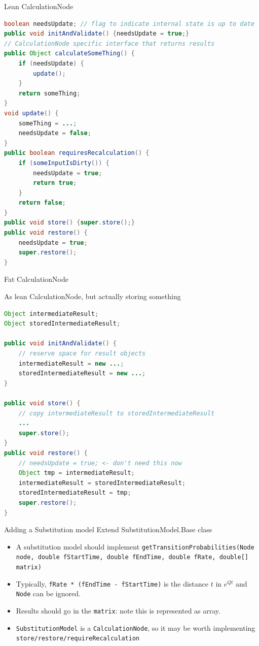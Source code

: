 \documentclass{beamer}
\theoremstyle{definition}
\begin{document}
\begin{frame}[containsverbatim]{Lean CalculationNode}


\begin{lstlisting}[language=java]
boolean needsUpdate; // flag to indicate internal state is up to date
public void initAndValidate() {needsUpdate = true;}
// CalculationNode specific interface that returns results
public Object calculateSomeThing() {
	if (needsUpdate) {
		update();
	}
	return someThing;
}
void update() {
	someThing = ...;
	needsUpdate = false;
}
public boolean requiresRecalculation() {
	if (someInputIsDirty()) {
		needsUpdate = true;
		return true;
	}
	return false;
}
public void store() {super.store();}
public void restore() {
	needsUpdate = true;
	super.restore();
}
\end{lstlisting}
\end{frame}

\begin{frame}[containsverbatim]{Fat CalculationNode}

As lean CalculationNode, but actually storing something

\begin{lstlisting}[language=java]
Object intermediateResult;
Object storedIntermediateResult;

public void initAndValidate() {
	// reserve space for result objects
	intermediateResult = new ...;
 	storedIntermediateResult = new ...;
}

public void store() {
	// copy intermediateResult to storedIntermediateResult
	...
	super.store();
}
public void restore() {
	// needsUpdate = true; <- don't need this now
	Object tmp = intermediateResult;
	intermediateResult = storedIntermediateResult;
	storedIntermediateResult = tmp;
	super.restore();
}
\end{lstlisting}

\end{frame}



\begin{frame}[containsverbatim]{Adding a Substitution model}
Extend SubstitutionModel.Base class

\begin{itemize}
\item A substitution model should implement {\tt getTransitionProbabilities(Node node, double fStartTime, double fEndTime, double fRate, double[] matrix)}
\item Typically, {\tt fRate * (fEndTime - fStartTime)} is the distance $t$ in $e^{Qt}$
and {\tt Node} can be ignored.
\item Results should go in the {\tt matrix}: note this is represented as array.
\item {\tt SubstitutionModel} is a {\tt CalculationNode}, so it may be worth implementing {\tt store/restore/requireRecalculation}
\end{itemize}

\end{frame}
\end{document}

